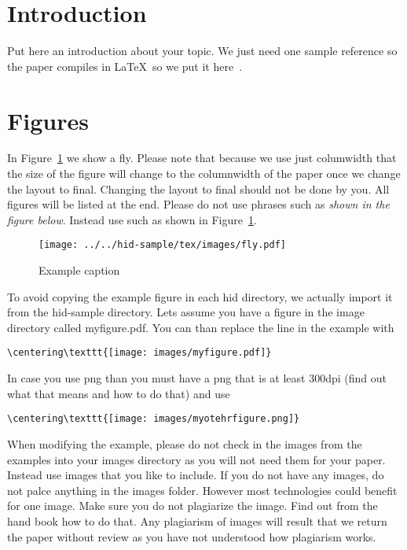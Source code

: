 \section{Introduction}

Put here an introduction about your topic. 
We just need one sample reference so the paper compiles in \LaTeX\ so we
put it here~\cite{editor00}.

\section{Figures}

In Figure~\ref{f:fly} we show a fly. Please note that because we use
just columwidth that the size of the figure will change to the
columnwidth of the paper once we change the layout to final. Changing
the layout to final should not be done by you. All figures will be
listed at the end.  Please do not use phrases such as \textit{shown in
  the figure below}. Instead use such as shown in Figure~\ref{f:fly}.

\begin{figure}[!ht]
  \centering\texttt{[image: ../../hid-sample/tex/images/fly.pdf]}
  \caption{Example caption}\label{f:fly}
\end{figure}

To avoid copying the example figure in each hid directory, we actually
import it from the hid-sample directory. Lets assume you have a figure
in the image directory called myfigure.pdf. You can than replace the
line in the example with

\begin{verbatim}
\centering\texttt{[image: images/myfigure.pdf]}
\end{verbatim}

In case you use png than you must have a png that is at least 300dpi
(find out what that means and how to do that) and use 

\begin{verbatim}
\centering\texttt{[image: images/myotehrfigure.png]}
\end{verbatim}

When modifying the example, please do not check in the images from the
examples into your images directory as you will not need them for your
paper. Instead use images that you like to include. If you do not have
any images, do not palce anything in the images folder. However most
technologies could benefit for one image. Make sure you do not
plagiarize the image. Find out from the hand book how to do that. Any
plagiarism of images will result that we return the paper without
review as you have not understood how plagiarism works.


